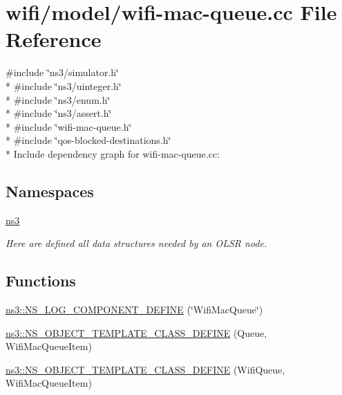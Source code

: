 \hypertarget{wifi-mac-queue_8cc}{}\section{wifi/model/wifi-\/mac-\/queue.cc File Reference}
\label{wifi-mac-queue_8cc}
{\ttfamily \#include \char`\"{}ns3/simulator.\+h\char`\"{}}\\*
{\ttfamily \#include \char`\"{}ns3/uinteger.\+h\char`\"{}}\\*
{\ttfamily \#include \char`\"{}ns3/enum.\+h\char`\"{}}\\*
{\ttfamily \#include \char`\"{}ns3/assert.\+h\char`\"{}}\\*
{\ttfamily \#include \char`\"{}wifi-\/mac-\/queue.\+h\char`\"{}}\\*
{\ttfamily \#include \char`\"{}qos-\/blocked-\/destinations.\+h\char`\"{}}\\*
Include dependency graph for wifi-\/mac-\/queue.cc\+:
\subsection*{Namespaces}
\begin{DoxyCompactItemize}
\item 
 \hyperlink{namespacens3}{ns3}
\begin{DoxyCompactList}\small\item\em Here are defined all data structures needed by an O\+L\+SR node. \end{DoxyCompactList}\end{DoxyCompactItemize}
\subsection*{Functions}
\begin{DoxyCompactItemize}
\item 
\hyperlink{namespacens3_abe0bdd2f0d3b97b1bb74e05f3f5a72ab}{ns3\+::\+N\+S\+\_\+\+L\+O\+G\+\_\+\+C\+O\+M\+P\+O\+N\+E\+N\+T\+\_\+\+D\+E\+F\+I\+NE} (\char`\"{}Wifi\+Mac\+Queue\char`\"{})
\item 
\hyperlink{namespacens3_a9f5b5e8801c3c7e476dd4888ad9ecb08}{ns3\+::\+N\+S\+\_\+\+O\+B\+J\+E\+C\+T\+\_\+\+T\+E\+M\+P\+L\+A\+T\+E\+\_\+\+C\+L\+A\+S\+S\+\_\+\+D\+E\+F\+I\+NE} (Queue, Wifi\+Mac\+Queue\+Item)
\item 
\hyperlink{namespacens3_a513ea7d2335ce43dac7b0a98776360ca}{ns3\+::\+N\+S\+\_\+\+O\+B\+J\+E\+C\+T\+\_\+\+T\+E\+M\+P\+L\+A\+T\+E\+\_\+\+C\+L\+A\+S\+S\+\_\+\+D\+E\+F\+I\+NE} (Wifi\+Queue, Wifi\+Mac\+Queue\+Item)
\end{DoxyCompactItemize}
